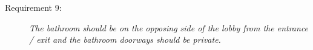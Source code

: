 \documentclass[12pt]{ucthesis}
\begin{document}
\begin{description}
\item[Requirement 9:] \emph{The bathroom should be on the opposing side of the lobby from the entrance / exit and the bathroom doorways should be private.}
\end{description}





   
\end{document}
